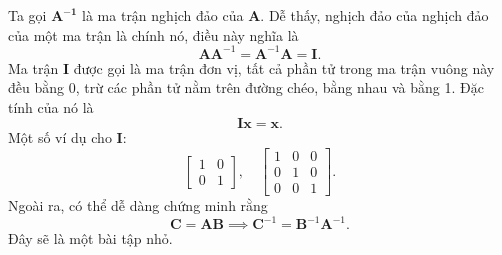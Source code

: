 Ta gọi \(\mathbf{A^{-1}}\) là ma trận nghịch đảo của \(\mathbf{A}\). Dễ thấy, nghịch đảo của nghịch đảo của một ma trận là chính nó, điều này nghĩa là
\[\mathbf{A}\mathbf{A}^{-1}=\mathbf{A}^{-1}\mathbf{A}=\mathbf{I}.\] Ma trận \(\mathbf{I}\) được gọi là ma trận đơn vị, tất cả phần tử trong ma trận vuông này đều bằng 0, trừ các phần tử nằm trên đường chéo, bằng nhau và bằng 1. Đặc tính của nó là 
\[\mathbf{I}\mathbf{x}=\mathbf{x}.\] Một số ví dụ cho \(\mathbf{I}\):
\[\begin{bmatrix}
    1&0\\
    0&1
\end{bmatrix},\quad
\begin{bmatrix}
    1&0&0\\
    0&1&0\\
    0&0&1
\end{bmatrix}.\]
Ngoài ra, có thể dễ dàng chứng minh rằng 
\[\mathbf{C}=\mathbf{AB}\implies \mathbf{C}^{-1}=\mathbf{B}^{-1}\mathbf{A}^{-1}.\] Đây sẽ là một bài tập nhỏ.
